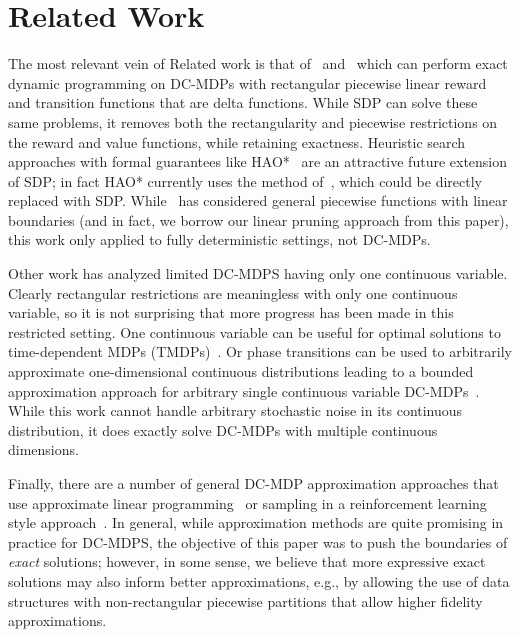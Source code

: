 \section{Related Work}

The most relevant vein of Related work is that of~\cite{feng04}
and~\cite{li05} which can perform exact dynamic programming on
DC-MDPs with rectangular piecewise linear reward and transition functions
that are delta functions.  While SDP can solve these same problems,
it removes both the rectangularity and piecewise restrictions on the
reward and value functions, while
retaining exactness.  
Heuristic search approaches with formal guarantees 
like HAO*~\cite{hao09} are an attractive future extension of SDP;
in fact HAO* currently uses the method of~\cite{feng04}, which could
be directly replaced with SDP.  While~\cite{penberthy94} has considered
general piecewise functions with linear boundaries (and in fact,
we borrow our linear pruning approach from this paper), this work
only applied to fully deterministic settings, not DC-MDPs.

Other work has analyzed limited DC-MDPS having only one continuous
variable.  Clearly rectangular restrictions are meaningless with
only one continuous variable, so it is not surprising that more
progress has been made in this restricted setting.  One continuous
variable can be useful for optimal solutions to time-dependent MDPs 
(TMDPs)~\cite{boyan01}.  Or phase transitions can be used to 
arbitrarily approximate one-dimensional continuous distributions
leading to a bounded approximation approach for arbitrary single continuous
variable DC-MDPs~\cite{phase07}.  
While this work cannot handle arbitrary stochastic
noise in its continuous distribution, it does exactly solve DC-MDPs
with multiple continuous dimensions.

Finally, there are a number of general DC-MDP approximation
approaches that use approximate linear programming~\cite{kveton06}
or sampling in a reinforcement learning style approach~\cite{munos02}.
In general, while approximation methods are quite promising in
practice for DC-MDPS, the objective of this paper was to push
the boundaries of \emph{exact} solutions; however, in some sense, 
we believe that more expressive exact solutions may also inform
better approximations, e.g., by allowing the use of data structures
with non-rectangular piecewise partitions that allow higher fidelity
approximations.
